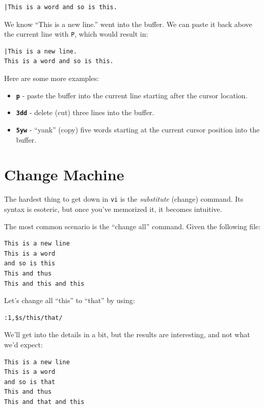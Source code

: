 \documentclass[10pt,]{book}
\numberwithin{figure}{chapter}
\begin{document}
\begin{verbatim}
|This is a word and so is this.
\end{verbatim}

We know ``This is a new line.'' went into the buffer. We can paste it
back above the current line with \texttt{P}, which would result in:

\begin{verbatim}
|This is a new line.
This is a word and so is this.
\end{verbatim}

Here are some more examples:

\begin{itemize}
\item
  \textbf{\texttt{p}} - paste the buffer into the current line starting
  after the cursor location.
\item
  \textbf{\texttt{3dd}} - delete (cut) three lines into the buffer.
\item
  \textbf{\texttt{5yw}} - ``yank'' (copy) five words starting at the
  current cursor position into the buffer.
\end{itemize}

\section{Change Machine}\label{change-machine}

The hardest thing to get down in \texttt{vi} is the \emph{substitute}
(change) command. Its syntax is esoteric, but once you've memorized it,
it becomes intuitive.

The most common scenario is the ``change all'' command. Given the
following file:

\begin{verbatim}
This is a new line
This is a word
and so is this
This and thus
This and this and this
\end{verbatim}

Let's change all ``this'' to ``that'' by using:

\begin{verbatim}
:1,$s/this/that/
\end{verbatim}

We'll get into the details in a bit, but the results are interesting,
and not what we'd expect:

\begin{verbatim}
This is a new line
This is a word
and so is that
This and thus
This and that and this
\end{verbatim}
\end{document}
